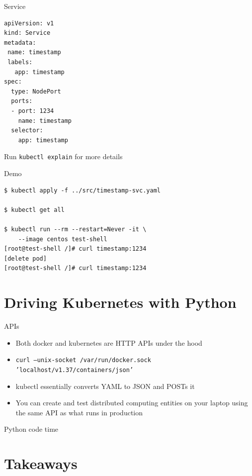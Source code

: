 \documentclass[xcolor=svgnames,17pt]{beamer}
\newcommand*{\sizefont}[1]{%
    \ifcase#1\relax
    \or \tiny
    \or \scriptsize
    \or \footnotesize
    \or \small
    \or \normalsize
    \or \large
    \or \Large
    \or \LARGE
    \or \huge
    \or \Huge
    \fi}
\begin{document}
\begin{frame}[fragile]{Service}
\sizefont{2}
\begin{verbatim}
apiVersion: v1
kind: Service
metadata:
 name: timestamp
 labels:
   app: timestamp
spec:
  type: NodePort
  ports:
  - port: 1234
    name: timestamp
  selector:
    app: timestamp
\end{verbatim}
Run \texttt{kubectl explain} for more details
\end{frame}

\begin{frame}[fragile]{Demo}
\begin{verbatim}
$ kubectl apply -f ../src/timestamp-svc.yaml

$ kubectl get all

$ kubectl run --rm --restart=Never -it \
    --image centos test-shell
[root@test-shell /]# curl timestamp:1234
[delete pod]
[root@test-shell /]# curl timestamp:1234

\end{verbatim}
\end{frame}

\section{Driving Kubernetes with Python}

\begin{frame}
\tableofcontents[currentsection]
\end{frame}

\begin{frame}{APIs}
\begin{itemize}
\item Both docker and kubernetes are HTTP APIs under the hood
\item \texttt{curl --unix-socket /var/run/docker.sock 'localhost/v1.37/containers/json'}
\pause
\item kubectl essentially converts YAML to JSON and POSTs it
\pause
\item You can create and test distributed computing entities on your laptop
using the same API as what runs in production
\end{itemize}
\end{frame}

\begin{frame}{Python code time}
\end{frame}

\section{Takeaways}
\end{document}
